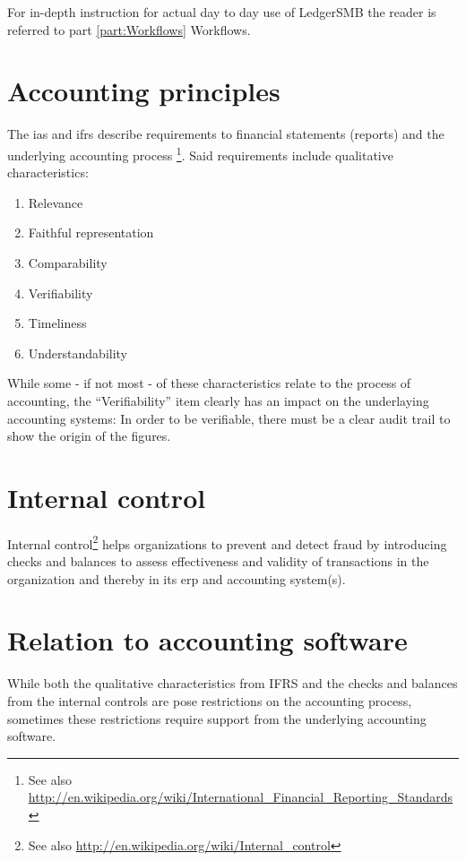 For in-depth instruction for actual day to day use of LedgerSMB the reader is referred
to part \ref{part:Workflows} Workflows.


\section{Accounting principles}

The \gls{ias} and \gls{ifrs} describe requirements
to financial statements (reports) and the underlying accounting process
\footnote{See also \url{http://en.wikipedia.org/wiki/International\_Financial\_Reporting\_Standards}}.
Said requirements include qualitative characteristics:

\begin{enumerate}
\item Relevance
\item Faithful representation
\item Comparability
\item Verifiability
\item Timeliness
\item Understandability
\end{enumerate}

While some - if not most - of these characteristics relate to the process of accounting,
the ``Verifiability'' item clearly has an impact on the underlaying accounting systems:
In order to be verifiable, there must be a clear audit trail to show the origin of the
figures.

\section{Internal control}

Internal control\footnote{See also \url{http://en.wikipedia.org/wiki/Internal\_control}}
helps organizations to prevent and detect fraud by introducing checks and balances
to assess effectiveness and validity of transactions in the organization and thereby
in its \gls{erp} and accounting system(s).


\section{Relation to accounting software}
\label{sec:AccountingSystemRequirements}

While both the qualitative characteristics from \gls{IFRS} and the checks and balances
from the internal controls are pose restrictions on the accounting process,
sometimes these restrictions require support from the underlying accounting
software.

